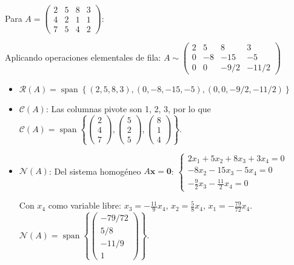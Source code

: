 \begin{example}
Para $A = \begin{pmatrix} 2 & 5 & 8 & 3 \\ 4 & 2 & 1 & 1 \\ 7 & 5 & 4 & 2 \end{pmatrix}$:
\begin{myproof}
Aplicando operaciones elementales de fila: $A \sim \begin{pmatrix} 2 & 5 & 8 & 3 \\ 0 & -8 & -15 & -5 \\ 0 & 0 & -9/2 & -11/2 \end{pmatrix}$

\begin{itemize}
    \item $\mathcal{R}(A) = \operatorname{span}\left\{ (2,5,8,3), (0,-8,-15,-5), (0,0,-9/2,-11/2) \right\}$
    \item $\mathcal{C}(A)$: Las columnas pivote son 1, 2, 3, por lo que $\mathcal{C}(A) = \operatorname{span}\left\{ \begin{pmatrix} 2 \\ 4 \\ 7 \end{pmatrix}, \begin{pmatrix} 5 \\ 2 \\ 5 \end{pmatrix}, \begin{pmatrix} 8 \\ 1 \\ 4 \end{pmatrix} \right\}.$
    \item $\mathcal{N}(A)$: Del sistema homogéneo $A\mathbf{x} = \mathbf{0}$:  $\begin{cases}
        2x_1 + 5x_2 + 8x_3 + 3x_4 = 0 \\
        -8x_2 -15x_3 -5x_4 = 0 \\
        -\frac{9}{2}x_3 -\frac{11}{2}x_4 = 0
        \end{cases}$
        
        
        Con $x_4$ como variable libre: $x_3 = -\frac{11}{9}x_4$, $x_2 = \frac{5}{8}x_4$, $x_1 = -\frac{79}{72}x_4$. $\mathcal{N}(A) = \operatorname{span}\left\{ \begin{pmatrix}-79/72\\5/8\\-11/9\\1\end{pmatrix} \right\}.$
\end{itemize}
\end{myproof}
\end{example}

